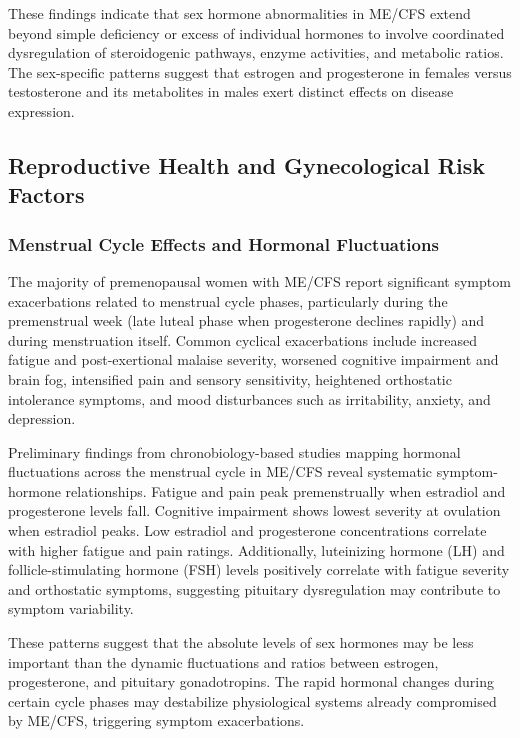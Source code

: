 These findings indicate that sex hormone abnormalities in ME/CFS extend beyond simple deficiency or excess of individual hormones to involve coordinated dysregulation of steroidogenic pathways, enzyme activities, and metabolic ratios. The sex-specific patterns suggest that estrogen and progesterone in females versus testosterone and its metabolites in males exert distinct effects on disease expression.

\subsection{Reproductive Health and Gynecological Risk Factors}

\subsubsection{Menstrual Cycle Effects and Hormonal Fluctuations}

The majority of premenopausal women with ME/CFS report significant symptom exacerbations related to menstrual cycle phases, particularly during the premenstrual week (late luteal phase when progesterone declines rapidly) and during menstruation itself. Common cyclical exacerbations include increased fatigue and post-exertional malaise severity, worsened cognitive impairment and brain fog, intensified pain and sensory sensitivity, heightened orthostatic intolerance symptoms, and mood disturbances such as irritability, anxiety, and depression.

\begin{observation}
\label{obs:menstrual-symptoms}
Preliminary findings from chronobiology-based studies mapping hormonal fluctuations across the menstrual cycle in ME/CFS reveal systematic symptom-hormone relationships. Fatigue and pain peak premenstrually when estradiol and progesterone levels fall. Cognitive impairment shows lowest severity at ovulation when estradiol peaks. Low estradiol and progesterone concentrations correlate with higher fatigue and pain ratings. Additionally, luteinizing hormone (LH) and follicle-stimulating hormone (FSH) levels positively correlate with fatigue severity and orthostatic symptoms, suggesting pituitary dysregulation may contribute to symptom variability.
\end{observation}

These patterns suggest that the absolute levels of sex hormones may be less important than the dynamic fluctuations and ratios between estrogen, progesterone, and pituitary gonadotropins. The rapid hormonal changes during certain cycle phases may destabilize physiological systems already compromised by ME/CFS, triggering symptom exacerbations.

